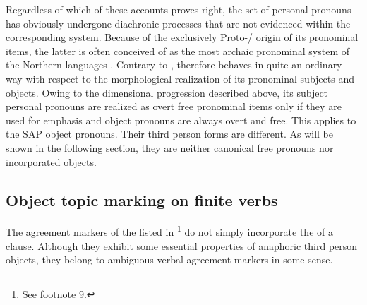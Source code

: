 \documentclass[output=paper]{LSP/langsci}
\begin{document}
Regardless of which of these accounts proves right, the  set of personal pronouns has obviously undergone diachronic processes that are not evidenced within the corresponding  system. Because of the exclusively Proto-/ origin of its pronominal items, the latter is often conceived of as the most archaic pronominal system of the Northern  languages \citep[120]{Siegl2009Personal}. Contrary to ,  therefore behaves in quite an ordinary way with respect to the morphological realization of its pronominal subjects and objects. Owing to the dimensional progression described above, its subject personal pronouns are realized as overt free pronominal items only if they are used for emphasis \citep[540]{Salminen1998Nenets} and object pronouns are always overt and free. This applies to the SAP object pronouns. Their third person forms are different. As will be shown in the following section, they are neither canonical free pronouns nor incorporated objects. 


\subsection{Object topic marking on finite verbs}\label{12-wr-sec:4-3}

The agreement markers of the   listed in  \footnote{See footnote 9.} do not simply incorporate the  of a clause. Although they exhibit some essential properties of anaphoric third person objects, they belong to ambiguous verbal agreement markers in some sense. 
\end{document}
